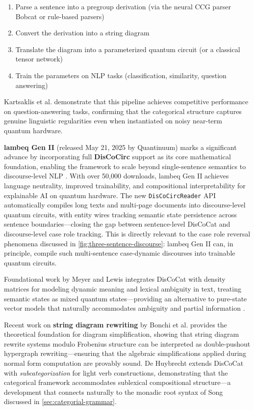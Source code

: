 \documentclass[
]{article}
\providecommand{\tightlist}{%
  \setlength{\itemsep}{0pt}\setlength{\parskip}{0pt}}
\begin{document}
\begin{enumerate}
\def\labelenumi{\arabic{enumi}.}
\tightlist
\item
  Parse a sentence into a pregroup derivation (via the neural CCG parser
  Bobcat or rule-based parsers)
\item
  Convert the derivation into a string diagram
\item
  Translate the diagram into a parameterized quantum circuit (or a
  classical tensor network)
\item
  Train the parameters on NLP tasks (classification, similarity,
  question answering)
\end{enumerate}

Kartsaklis et al. \citeyearpar{kartsaklis2021functorial} demonstrate
that this pipeline achieves competitive performance on
question-answering tasks, confirming that the categorical structure
captures genuine linguistic regularities even when instantiated on noisy
near-term quantum hardware.

\textbf{lambeq Gen II} (released May 21, 2025 by Quantinuum) marks a
significant advance by incorporating full \textbf{DisCoCirc} support as
its core mathematical foundation, enabling the framework to scale beyond
single-sentence semantics to discourse-level NLP
\citep{lambeq2025genii, quantinuum2025genii}. With over 50,000
downloads, lambeq Gen II achieves language neutrality, improved
trainability, and compositional interpretability for explainable AI on
quantum hardware. The new \texttt{DisCoCircReader} API automatically
compiles long texts and multi-page documents into discourse-level
quantum circuits, with entity wires tracking semantic state persistence
across sentence boundaries---closing the gap between sentence-level
DisCoCat and discourse-level case role tracking. This is directly
relevant to the case role reversal phenomena discussed in
\autoref{fig:three-sentence-discourse}: lambeq Gen II can, in principle,
compile such multi-sentence case-dynamic discourses into trainable
quantum circuits.

Foundational work by Meyer and Lewis integrates DisCoCat with density
matrices for modeling dynamic meaning and lexical ambiguity in text,
treating semantic states as mixed quantum states---providing an
alternative to pure-state vector models that naturally accommodates
ambiguity and partial information \citeyearpar{meyer2020modelling}.

Recent work on \textbf{string diagram rewriting} by Bonchi et al.
\citeyearpar{bonchi2022rewriting} provides the theoretical foundation
for diagram simplification, showing that string diagram rewrite systems
modulo Frobenius structure can be interpreted as double-pushout
hypergraph rewriting---ensuring that the algebraic simplifications
applied during normal form computation are provably sound. De Huybrecht
\citeyearpar{dehuybrecht2024subcategorizing} extends DisCoCat with
\emph{subcategorization} for light verb constructions, demonstrating
that the categorical framework accommodates sublexical compositional
structure---a development that connects naturally to the monadic root
syntax of Song \citeyearpar{song2022act} discussed in
\autoref{sec:categorial-grammar}.
\end{document}
